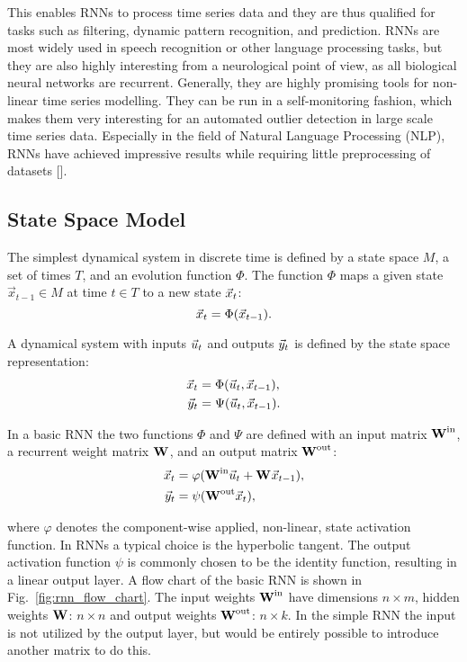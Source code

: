 This enables RNNs to process time series data and they are thus qualified for
tasks such as filtering, dynamic pattern recognition, and prediction.  RNNs are
most widely used in speech recognition or other language processing tasks, but
they are also highly interesting from a neurological point of view, as all
biological neural networks are recurrent.  Generally, they are highly promising
tools for non-linear time series modelling.  They can be run in a
self-monitoring fashion, which makes them very interesting for an automated
outlier detection in large scale time series data.  Especially in the field of
Natural Language Processing (NLP), RNNs have achieved impressive results while
requiring little preprocessing of datasets [\cite{sutskever2011generating}].


\subsection{State Space Model}
\label{ssub:state_space_model}

The simplest dynamical system in discrete time is defined by a state space $M$,
a set of times $T$, and an evolution function $\Phi$.  The function $\Phi$ maps
a given state $\vec{x}_{t-1} \in M$ at time $t \in T$ to a new state $\vec{x}_t$:
\begin{equation}
  \vec{x}_t = \Phi(\vec{x}_{t-1}).
\end{equation}

A dynamical system with inputs $\vec{u}_t$ and outputs $\vec{y}_t$ is defined by
the state space representation:
\begin{align}
  \vec{x}_t &= \Phi(\vec{u}_t, \vec{x}_{t-1}), \\
  \vec{y}_t &= \Psi(\vec{u}_t, \vec{x}_{t-1}).
\end{align}

In a basic RNN the two functions $\Phi$ and $\Psi$ are defined with an input
matrix $\boldsymbol{\textbf{W}}^{\text{in}}$, a recurrent weight matrix $\boldsymbol{\textbf{W}}^{\text{}}$, and an output matrix
$\boldsymbol{\textbf{W}}^{\text{out}}$:
\begin{align}
  \label{eq:state_space}
  \vec{x}_t &= \varphi(\boldsymbol{\textbf{W}}^{\text{in}} \vec{u}_t + \boldsymbol{\textbf{W}}^{\text{}}\vec{x}_{t-1}), \\
  \label{eq:readout}
  \vec{y}_t &= \psi(\boldsymbol{\textbf{W}}^{\text{out}} \vec{x}_t),
\end{align}

where $\varphi$ denotes the component-wise applied, non-linear, state
activation function. In RNNs a typical choice is the hyperbolic tangent.  The
output activation function $\psi$ is commonly chosen to be the identity
function, resulting in a linear output layer.  A flow chart of the basic RNN is
shown in Fig.~\ref{fig:rnn_flow_chart}.  The input weights $\boldsymbol{\textbf{W}}^{\text{in}}$ have
dimensions $n \times m$, hidden weights $\boldsymbol{\textbf{W}}^{\text{}}$: $n \times n$ and
output weights $\boldsymbol{\textbf{W}}^{\text{out}}$: $n \times k$. In the simple RNN the input is
not utilized by the output layer, but would be entirely possible to introduce
another matrix to do this.

